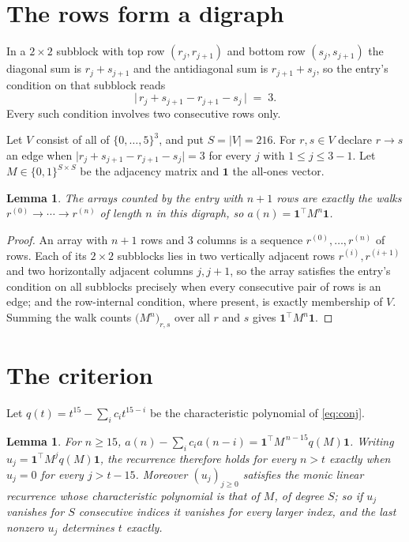 \documentclass[11pt,a4paper]{article}
\theoremstyle{plain}
\newtheorem{lemma}[theorem]{Lemma}
\theoremstyle{definition}
\begin{document}
\section{The rows form a digraph}

In a $2\times2$ subblock with top row $(r_j,r_{j+1})$ and bottom row $(s_j,s_{j+1})$ the
diagonal sum is $r_j+s_{j+1}$ and the antidiagonal sum is $r_{j+1}+s_j$, so the entry's
condition on that subblock reads
\[
\bigl|\,r_j+s_{j+1}-r_{j+1}-s_j\,\bigr|\;=\;3.
\]
Every such condition involves two consecutive rows only.

Let $V$ consist of all of $\{0,\dots,5\}^{3}$, and put $S=|V|=216$. For $r,s\in V$ declare $r\to s$ an edge
when $\bigl|r_j+s_{j+1}-r_{j+1}-s_j\bigr|=3$ for every $j$ with
$1\le j\le3-1$. Let $M\in\{0,1\}^{S\times S}$ be the adjacency matrix and $\mathbf{1}$
the all-ones vector.

\begin{lemma}\label{lem:walk}
The arrays counted by the entry with $n+1$ rows are exactly the walks
$r^{(0)}\to\cdots\to r^{(n)}$ of length $n$ in this digraph, so
$a(n)=\mathbf{1}^{\!\top}M^{n}\mathbf{1}$.
\end{lemma}

\begin{proof}
An array with $n+1$ rows and $3$ columns is a sequence $r^{(0)},\dots,r^{(n)}$ of
rows. Each of its $2\times2$ subblocks lies in two vertically adjacent rows
$r^{(i)},r^{(i+1)}$ and two horizontally adjacent columns $j,j+1$, so the array satisfies
the entry's condition on all subblocks precisely when every consecutive pair of rows is an
edge; and the row-internal condition, where present, is exactly membership of $V$. Summing
the walk counts $\bigl(M^{n}\bigr)_{r,s}$ over all $r$ and $s$ gives
$\mathbf{1}^{\!\top}M^{n}\mathbf{1}$.
\end{proof}

\section{The criterion}

Let $q(t)=t^{15}-\sum_i c_i t^{15-i}$ be the characteristic polynomial of
\eqref{eq:conj}.

\begin{lemma}\label{lem:crit}
For $n\ge15$,
$a(n)-\sum_i c_i a(n-i)=\mathbf{1}^{\!\top}M^{\,n-15}q(M)\mathbf{1}$. Writing
$u_j=\mathbf{1}^{\!\top}M^{j}q(M)\mathbf{1}$, the recurrence therefore holds for every
$n>t$ exactly when $u_j=0$ for every $j>t-15$. Moreover $(u_j)_{j\ge0}$ satisfies the
monic linear recurrence whose characteristic polynomial is that of $M$, of degree $S$; so
if $u_j$ vanishes for $S$ consecutive indices it vanishes for every larger index, and the
last nonzero $u_j$ determines $t$ exactly.
\end{lemma}
\end{document}
